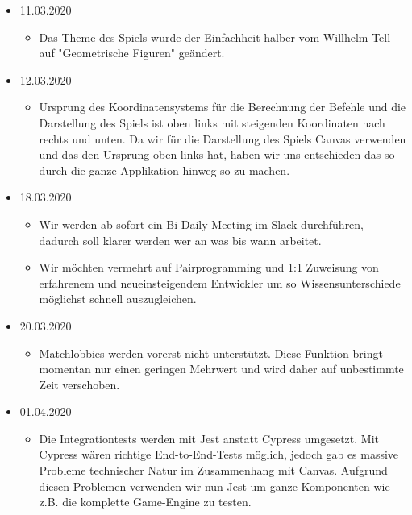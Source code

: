 \documentclass[11pt,a4paper]{scrartcl}
\begin{document}
\begin{itemize}
\begin{itemize}
        \end{itemize}
  \item 11.03.2020
        \begin{itemize}
          \item Das Theme des Spiels wurde der Einfachheit halber vom Willhelm Tell auf "Geometrische Figuren" geändert.
        \end{itemize}
  \item 12.03.2020
        \begin{itemize}
          \item Ursprung des Koordinatensystems für die Berechnung der Befehle und die Darstellung des Spiels ist oben links
                mit steigenden Koordinaten nach rechts und unten. Da wir für die Darstellung des Spiels Canvas verwenden und das den
                Ursprung oben links hat, haben wir uns entschieden das so durch die ganze Applikation hinweg so zu machen.
        \end{itemize}
  \item 18.03.2020
        \begin{itemize}
          \item Wir werden ab sofort ein Bi-Daily Meeting im Slack durchführen, dadurch soll klarer werden wer an was bis wann arbeitet.
          \item Wir möchten vermehrt auf Pairprogramming und 1:1 Zuweisung von erfahrenem und neueinsteigendem Entwickler um so
                Wissensunterschiede möglichst schnell auszugleichen.
        \end{itemize}
  \item 20.03.2020
        \begin{itemize}
          \item Matchlobbies werden vorerst nicht unterstützt. Diese Funktion bringt momentan nur einen geringen Mehrwert und wird daher auf unbestimmte
                Zeit verschoben.
        \end{itemize}
  \item 01.04.2020
        \begin{itemize}
          \item Die Integrationtests werden mit Jest anstatt Cypress umgesetzt. Mit Cypress wären richtige End-to-End-Tests möglich, jedoch gab es massive Probleme technischer Natur im Zusammenhang mit Canvas. 
                Aufgrund diesen Problemen verwenden wir nun Jest um ganze Komponenten wie z.B. die komplette Game-Engine zu testen.
        \end{itemize}
\end{itemize}

\clearpage
\end{document}
